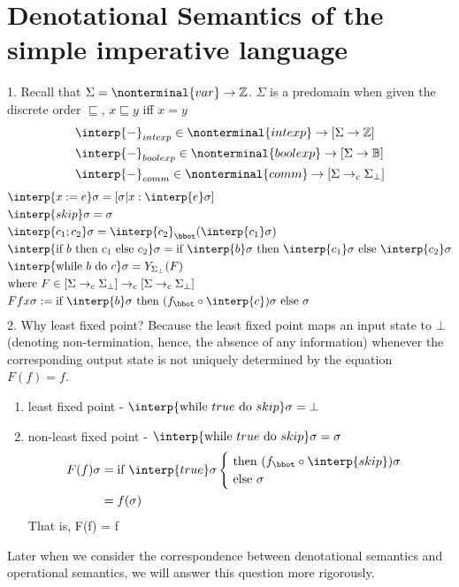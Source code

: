 \documentclass{report}[12pt]
\begin{document}
\section{Denotational Semantics of the simple imperative language}
1. Recall that $\Sigma = \nonterminal{var}\rightarrow \mathbb{Z}$. $\Sigma$ is a predomain when given the discrete order $\sqsubseteq$, $x\sqsubseteq y$ iff $x=y$
\begin{align*}
    &\interp{-}_{intexp} \in \nonterminal{intexp} \rightarrow [\Sigma \rightarrow \mathbb{Z}] \\
    &\interp{-}_{boolexp} \in \nonterminal{boolexp} \rightarrow [\Sigma \rightarrow \mathbb{B}] \\
    &\interp{-}_{comm} \in \nonterminal{comm} \rightarrow [\Sigma \rightarrow_c \Sigma_\bot]
\end{align*}
\begin{align*}
    &\interp{x:=e}\sigma = [\sigma | x:\interp{e}\sigma] \\
    &\interp{skip}\sigma = \sigma \\
    &\interp{c_1;c_2}\sigma = \interp{c_2}_\bbot (\interp{c_1}\sigma) \\
    &\interp{\text{if }b\text{ then }c_1 \text{ else }c_2} \sigma = \text{if }\interp{b}\sigma \text{ then }\interp{c_1}\sigma \text{ else }\interp{c_2}\sigma \\
    &\interp{\text{while }b\text{ do }c}\sigma = Y_{\Sigma_\bot}(F) \\
    &\text{where }F\in [\Sigma\rightarrow_c \Sigma_\bot] \rightarrow_c [\Sigma \rightarrow_c \Sigma_\bot] \\
    &F f x \sigma := \text{if }\interp{b}\sigma \text{ then }(f_\bbot \circ \interp{c}) \sigma \text{ else }\sigma
\end{align*}
2. Why least fixed point? Because the least fixed point maps an input state to $\bot$ (denoting non-termination, hence, the absence of any information) whenever the corresponding output state is not uniquely determined by the equation $F(f)=f$.
\begin{enumerate}
    \item least fixed point - $\interp{\text{while }true \text{ do }skip}\sigma = \bot$
    \item non-least fixed point - $\interp{\text{while }true \text{ do }skip}\sigma = \sigma$
    \begin{align}
        F(f)\sigma &= \text{if }\interp{true}\sigma \begin{cases}
            \text{ then }(f_\bbot \circ \interp{skip})\sigma \\
            \text{ else }\sigma
        \end{cases} \\
        &= f(\sigma)
    \end{align}
    That is, F(f) = f
\end{enumerate}
Later when we consider the correspondence between denotational semantics and operational semantics, we will answer this question more rigorously.
\end{document}

